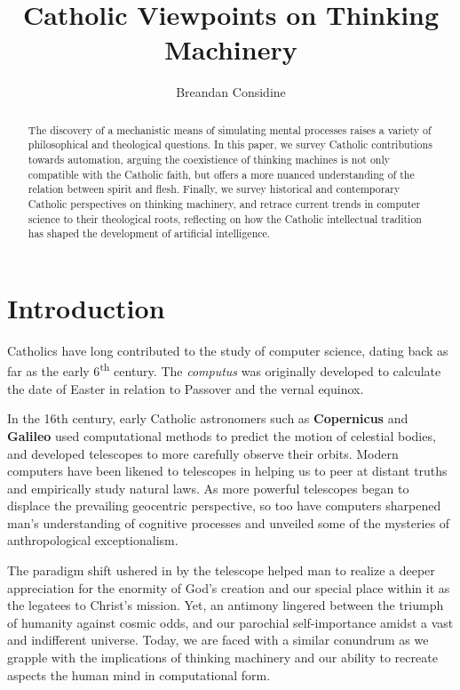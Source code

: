 \documentclass[sigplan,nonacm]{acmart}\settopmatter{printfolios=false,printccs=false,printacmref=false}
\begin{document}
  \title{Catholic Viewpoints on Thinking Machinery}
  \begin{abstract}
  The discovery of a mechanistic means of simulating mental processes raises a variety of philosophical and theological questions. In this paper, we survey Catholic contributions towards automation, arguing the coexistience of thinking machines is not only compatible with the Catholic faith, but offers a more nuanced understanding of the relation between spirit and flesh. Finally, we survey historical and contemporary Catholic perspectives on thinking machinery, and retrace current trends in computer science to their theological roots, reflecting on how the Catholic intellectual tradition has shaped the development of artificial intelligence.
  \end{abstract}

  \author{Breandan Considine}

  \maketitle

  \section{Introduction}

  Catholics have long contributed to the study of computer science, dating back as far as the early 6\textsuperscript{th} century. The \textit{computus} was originally developed to calculate the date of Easter in relation to Passover and the vernal equinox.

  In the 16th century, early Catholic astronomers such as \textbf{Copernicus} and \textbf{Galileo} used computational methods to predict the motion of celestial bodies, and developed telescopes to more carefully observe their orbits. Modern computers have been likened to telescopes in helping us to peer at distant truths and empirically study natural laws. As more powerful telescopes began to displace the prevailing geocentric perspective, so too have computers sharpened man's understanding of cognitive processes and unveiled some of the mysteries of anthropological exceptionalism.

  The paradigm shift ushered in by the telescope helped man to realize a deeper appreciation for the enormity of God's creation and our special place within it as the legatees to Christ's mission. Yet, an antimony lingered between the triumph of humanity against cosmic odds, and our parochial self-importance amidst a vast and indifferent universe. Today, we are faced with a similar conundrum as we grapple with the implications of thinking machinery and our ability to recreate aspects the human mind in computational form.
\end{document}
